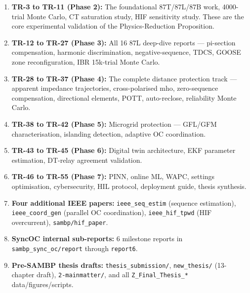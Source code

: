 \documentclass[11pt,a4paper]{article}
\begin{document}
\begin{enumerate}
  \item \textbf{TR-3 to TR-11 (Phase 2):} The foundational 87T/87L/87B work,
    4000-trial Monte Carlo, CT saturation study, HIF sensitivity study.
    These are the core experimental validation of the Physics-Reduction Proposition.

  \item \textbf{TR-12 to TR-27 (Phase 3):} All 16 87L deep-dive reports —
    pi-section compensation, harmonic discrimination, negative-sequence, TDCS,
    GOOSE zone reconfiguration, IBR 15k-trial Monte Carlo.

  \item \textbf{TR-28 to TR-37 (Phase 4):} The complete distance protection track —
    apparent impedance trajectories, cross-polarised mho, zero-sequence compensation,
    directional elements, POTT, auto-reclose, reliability Monte Carlo.

  \item \textbf{TR-38 to TR-42 (Phase 5):} Microgrid protection —
    GFL/GFM characterisation, islanding detection, adaptive OC coordination.

  \item \textbf{TR-43 to TR-45 (Phase 6):} Digital twin architecture,
    EKF parameter estimation, DT-relay agreement validation.

  \item \textbf{TR-46 to TR-55 (Phase 7):} PINN, online ML, WAPC,
    settings optimisation, cybersecurity, HIL protocol, deployment guide,
    thesis synthesis.

  \item \textbf{Four additional IEEE papers:} \texttt{ieee\_seq\_estim}
    (sequence estimation), \texttt{ieee\_coord\_gen} (parallel OC coordination),
    \texttt{ieee\_hif\_tpwd} (HIF overcurrent), \texttt{sambp/hif\_paper}.

  \item \textbf{SyncOC internal sub-reports:} 6 milestone reports in
    \texttt{sambp\_sync\_oc/report} through \texttt{report6}.

  \item \textbf{Pre-SAMBP thesis drafts:} \texttt{thesis\_submission/},
    \texttt{new\_thesis/} (13-chapter draft), \texttt{2-mainmatter/},
    and all \texttt{Z\_Final\_Thesis\_*} data/figures/scripts.
\end{enumerate}

\newpage
\end{document}
